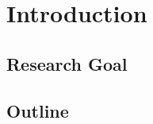 \chapter{Introduction} \label{chap:intro}

\section{Research Goal}\label{sect:thefirst}
\section{Outline}